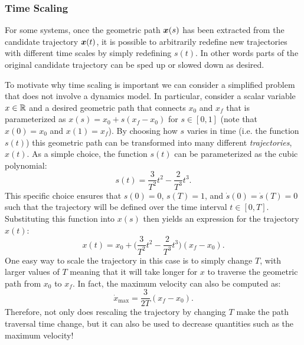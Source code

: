 \subsubsection{Time Scaling}
For some systems, once the geometric path $\bm{x}(s)$ has been extracted from the candidate trajectory $\bm{x}(t)$, it is possible to arbitrarily redefine new trajectories with different time scales by simply redefining $s(t)$. In other words parts of the original candidate trajectory can be sped up or slowed down as desired. 

To motivate why time scaling is important we can consider a simplified problem that does not involve a dynamics model. In particular, consider a scalar variable $x \in \mathbb{R}$ and a desired geometric path that connects $x_0$ and $x_f$ that is parameterized as $x(s) = x_0 + s(x_f - x_0)$ for $s \in [0,1]$ (note that $x(0) = x_0$ and $x(1) = x_f$). By choosing how $s$ varies in time (i.e. the function $s(t)$) this geometric path can be transformed into many different \textit{trajectories}, $x(t)$. As a simple choice, the function $s(t)$ can be parameterized as the cubic polynomial:
\begin{equation*}
    s(t) = \frac{3}{T^2}t^2 - \frac{2}{T^3}t^3.
\end{equation*}
This specific choice ensures that $s(0) = 0$, $s(T) = 1$, and $\dot{s}(0) = \dot{s}(T) = 0$ such that the trajectory will be defined over the time interval $t \in [0,T]$. Substituting this function into $x(s)$ then yields an expression for the trajectory $x(t)$:
\begin{equation*}
    x(t) = x_0 + \big(\frac{3}{T^2}t^2 - \frac{2}{T^3}t^3 \big)(x_f - x_0).
\end{equation*}
One easy way to scale the trajectory in this case is to simply change $T$, with larger values of $T$ meaning that it will take longer for $x$ to traverse the geometric path from $x_0$ to $x_f$. In fact, the maximum velocity can also be computed as:
\begin{equation*}
    \dot{x}_{\text{max}} = \frac{3}{2T}(x_f - x_0).
\end{equation*}
Therefore, not only does rescaling the trajectory by changing $T$ make the path traversal time change, but it can also be used to decrease quantities such as the maximum velocity!

